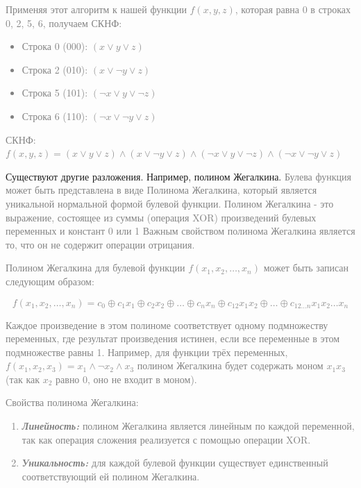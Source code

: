 \documentclass[12pt,letterpaper]{article}
\begin{document}
\textcolor{gray}{Применяя этот алгоритм к нашей функции \(f(x, y, z)\), которая равна 0 в строках 0, 2, 5, 6, получаем СКНФ:}

\textcolor{gray}{\begin{itemize}
  \item Строка 0 (000): \((x \vee y \vee z)\)
  \item Строка 2 (010): \((x \vee \neg y \vee z)\)
  \item Строка 5 (101): \((\neg x \vee y \vee \neg z)\)
  \item Строка 6 (110): \((\neg x \vee \neg y \vee z)\)
\end{itemize}}

\textcolor{gray}{СКНФ: \(f(x, y, z) = (x \vee y \vee z) \wedge (x \vee \neg y \vee z) \wedge (\neg x \vee y \vee \neg z) \wedge (\neg x \vee \neg y \vee z)\)}

Существуют другие разложения. Например, полином Жегалкина. \textcolor{gray}{Булева функция может быть представлена в виде Полинома Жегалкина, который является уникальной нормальной формой булевой функции. Полином Жегалкина - это выражение, состоящее из суммы (операция XOR) произведений булевых переменных и констант 0 или 1 Важным свойством полинома Жегалкина является то, что он не содержит операции отрицания.}

\textcolor{gray}{Полином Жегалкина для булевой функции \(f(x_1, x_2, \ldots, x_n)\) может быть записан следующим образом:}

\textcolor{gray}{\[f(x_1, x_2, \ldots, x_n) = c_0 \oplus c_1 x_1 \oplus c_2 x_2 \oplus \ldots \oplus c_n x_n \oplus c_{12} x_1 x_2 \oplus \ldots \oplus c_{12 \ldots n} x_1 x_2 \ldots x_n\]}

\textcolor{gray}{Каждое произведение в этом полиноме соответствует одному подмножеству переменных, где результат произведения истинен, если все переменные в этом подмножестве равны 1. Например, для функции трёх переменных, \(f(x_1, x_2, x_3) = x_1 \wedge \neg x_2 \wedge x_3\) полином Жегалкина будет содержать моном \(x_1 x_3\) (так как \(x_2\) равно 0, оно не входит в моном).}

\textcolor{gray}{Свойства полинома Жегалкина:}

\textcolor{gray}{\begin{enumerate}
  \item \textbf{\emph{Линейность:}} полином Жегалкина является линейным по каждой переменной, так как операция сложения реализуется с помощью операции XOR.
  \item \textbf{\emph{Уникальность:}} для каждой булевой функции существует единственный соответствующий ей полином Жегалкина. 
\end{enumerate}}
\end{document}
